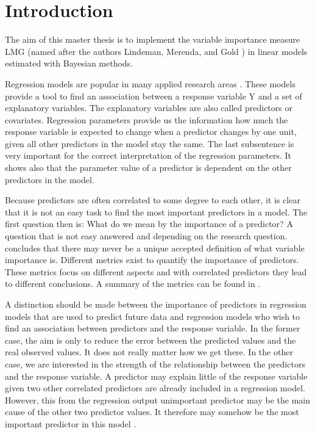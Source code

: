 \documentclass[11pt,a4paper,twoside]{book}
\begin{document}







\chapter{Introduction}

The aim of this master thesis is to implement the variable importance measure LMG  (named after the authors Lindeman, Merenda, and Gold \citep{Gromping2007}) in linear models estimated with Bayesian methods. 

Regression models are popular in many applied research areas \citep{Nimon2013}. These models provide a tool to find an association between a response variable Y and a set of explanatory variables. The explanatory variables are also called predictors or covariates. Regression parameters provide us the information how much the response variable is expected to change when a predictor changes by one unit, given all other predictors in the model stay the same. The last subsentence is very important for the correct interpretation of the regression parameters. It shows also that the parameter value of a predictor is dependent on the other predictors in the model.

Because predictors are often correlated to some degree to each other, it is clear that it is not an easy task to find the most important predictors in a model. The first question then is: What do we  mean by the importance of a predictor? A question that is not easy answered and depending on the research question. \cite{Gromping2015} concludes that there may never  be a unique accepted definition of what variable importance is. Different metrics exist to quantify the importance of predictors. These metrics focus on different aspects and with correlated predictors they  lead to different conclusions.  A summary of the metrics can be found in  \cite{Gromping2015}.  

A distinction should be made between the importance of predictors in regression models that are used to predict future data and regression models who wish to find an association between predictors and the response variable. In the former case, the aim is only to reduce the error between the predicted values and the real observed values. It does not really matter how we get there. In the other case, we are interested in the strength of the relationship between the predictors and the response variable. A predictor may explain little of the response variable given two other correlated predictors are already included in a regression model. However, this from the regression output unimportant predictor may be the main cause of the other two predictor values.  It therefore may somehow be the most important predictor in this model \citep{Gromping2007}. 
\end{document}
